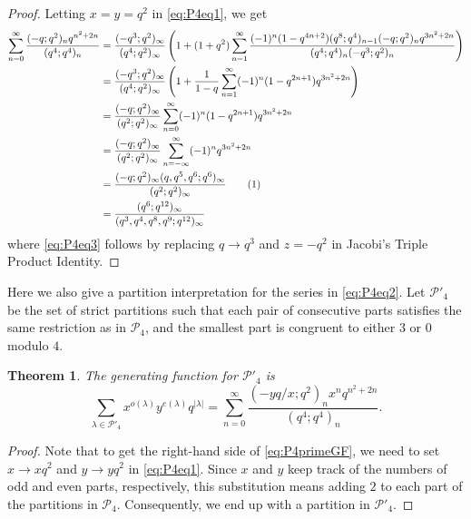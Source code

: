 \documentclass[11pt]{amsart}
\newtheorem{theorem}{Theorem}[section]
\theoremstyle{definition}
\theoremstyle{remark}
\numberwithin{equation}{section}
\newcommand\numberthis{\addtocounter{equation}{1}\tag{\theequation}}
\begin{document}
\begin{proof}
Letting $x=y=q^2$ in \eqref{eq:P4eq1}, we get
\begin{align*}
\sum_{n=0}^{\infty}\frac{(-q;q^2)_{n}q^{n^2+2n}}{(q^4;q^4)_{n}} &= \frac{(-q^3;q^2)_{\infty}}{(q^4;q^2)_{\infty}}\left(1+(1+q^2)\sum\limits_{n=1}^{\infty}\frac{(-1)^n(1-q^{4n+2})(q^8;q^4)_{n-1}(-q;q^2)_nq^{3n^2+2n}}{(q^4;q^4)_n(-q^3;q^2)_n}\right)\\
&= \frac{(-q^3;q^2)_{\infty}}{(q^4;q^2)_{\infty}}\left(1+\frac{1}{1-q}\sum\limits_{n=1}^{\infty}(-1)^n(1-q^{2n+1})q^{3n^2+2n}\right)\\
&= \frac{(-q;q^2)_{\infty}}{(q^2;q^2)_{\infty}}\sum\limits_{n=0}^{\infty}(-1)^n(1-q^{2n+1})q^{3n^2+2n}\\
&= \frac{(-q;q^2)_{\infty}}{(q^2;q^2)_{\infty}}\sum\limits_{n=-\infty}^{\infty}(-1)^nq^{3n^2+2n}\\
&= \frac{(-q;q^2)_{\infty}(q,q^5,q^6;q^6)_{\infty}}{(q^2;q^2)_{\infty}}\numberthis\label{eq:P4eq3}\\
&= \frac{(q^6;q^{12})_{\infty}}{(q^3,q^4,q^8,q^9;q^{12})_{\infty}}
\end{align*}
where \eqref{eq:P4eq3} follows by replacing $q\rightarrow q^3$ and $z=-q^2$ in Jacobi's Triple Product Identity.
\end{proof}
Here we also give a partition interpretation for the series in \eqref{eq:P4eq2}. Let $\mathcal{P}'_4$ be the set of strict partitions such that each pair of consecutive parts satisfies the same restriction as in $\mathcal{P}_4$, and the smallest part is congruent to either $3$ or $0$ modulo $4$.
\begin{theorem}\label{thm:P4primeGF}
The generating function for $\mathcal{P}'_4$ is
\begin{equation}\label{eq:P4primeGF}
\sum_{\lambda\in\mathcal{P}'_4}x^{o(\lambda)}y^{e(\lambda)}q^{|\lambda|}=\sum_{n=0}^{\infty}\frac{(-yq/x;q^2)_{n}x^nq^{n^2+2n}}{(q^4;q^4)_{n}}.
\end{equation}
\end{theorem}

\begin{proof}
Note that to get the right-hand side of \eqref{eq:P4primeGF}, we need to set $x\to xq^2$ and $y\to yq^2$ in \eqref{eq:P4eq1}. Since $x$ and $y$ keep track of the numbers of odd and even parts, respectively, this substitution means adding $2$ to each part of the partitions in $\mathcal{P}_4$. Consequently, we end up with a partition in $\mathcal{P}'_4$.
\end{proof}
\end{document}
